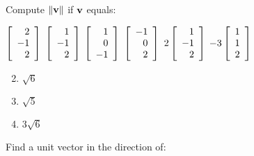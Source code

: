 \begin{multicols}{2}
\begin{ex}
Compute $\|\textbf{v}\|$ if $\textbf{v}$ equals:

\begin{exenumerate}[column-sep=-5em]
\exitem $\left[
\begin{array}{r}
2 \\
-1 \\
2
\end{array}
\right]$ 
\exitem $\left[
\begin{array}{r}
1 \\
-1 \\
2
\end{array}
\right]$
\exitem $\left[
\begin{array}{r}
1 \\
0 \\
-1
\end{array}
\right]$
\exitem $\left[
\begin{array}{r}
-1 \\
0 \\
2
\end{array}
\right]$
\exitem $2\left[
\begin{array}{r}
1 \\
-1 \\
2
\end{array}
\right]$
\exitem $-3\left[
\begin{array}{r}
1 \\
1 \\
2
\end{array}
\right]$
\end{exenumerate}
\begin{sol}
\begin{enumerate}[label={\alph*.}]
\setcounter{enumi}{1}
\item $\sqrt{6}$ 

\setcounter{enumi}{3}
\item $\sqrt{5}$

\setcounter{enumi}{5}
\item $3\sqrt{6}$


\end{enumerate}
\end{sol}
\end{ex}


\begin{ex}
Find a unit vector in the direction of:


\end{ex}
\end{multicols}
